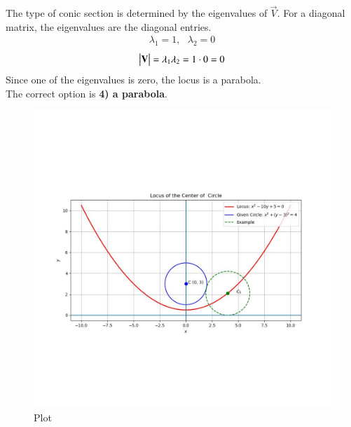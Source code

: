 \documentclass[journal]{IEEEtran}
\begin{document}
The type of conic section is determined by the eigenvalues of $\vec{V}$. For a diagonal matrix, the eigenvalues are the diagonal entries.
\begin{align}
    \lambda_1 = 1, \text{ } \lambda_2 = 0
\end{align}
\begin{align}
    \begin{vmatrix}\mathbf{V}\end{vmatrix} = \lambda_1\lambda_2 = 1 \cdot 0 = 0
\end{align}
Since one of the eigenvalues is zero, the locus is a parabola. \\
The correct option is \textbf{4) a parabola}.

\begin{figure}[h!]
    \centering
    \includegraphics[width=0.8\columnwidth]{figs/plot_c.jpg}
    \caption*{Plot}
    \label{fig:fig}
\end{figure}
\end{document}
